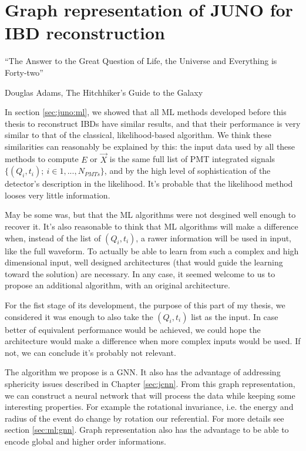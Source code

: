 \documentclass[../main.tex]{subfiles}
\begin{document}
\chapter{Graph representation of JUNO for IBD reconstruction}
\label{sec:jgnn}
\epigraph{``The Answer to the Great Question of Life, the Universe and Everything is Forty-two''}{Douglas Adams, The Hitchhiker’s Guide to the Galaxy}

\minitoc


In section \ref{sec:juno:ml}, we showed that all ML methods developed before this thesis to reconstruct IBDs have similar results, and that their performance is very similar to that of the classical, likelihood-based algorithm.
We think these similarities can reasonably be explained by this: the input data used by all these methods to compute $E$ or $\vec{X}$  is the same full list of PMT integrated signals $ \{ (Q_i,t_i) ; ~ i \in  1, ..., N_{PMTs} \}$, and by the high level of sophistication of the detector's description in the likelihood. It's probable that the likelihood method looses very little information.

May be some was, but that the ML algorithms were not desgined well enough to recover it. It's also reasonable to think that ML algorithms will make a difference when, instead of the list of $(Q_i, t_i)$, a rawer information will be used in input, like the full waveform.
To actually be able to learn from such a complex and high dimensional input, well designed architectures (that would guide the learning toward the solution) are necessary. In any case, it seemed welcome to us to propose an additional algorithm, with an original architecture.

For the fist stage of its development, the purpose of this part of my thesis, we considered it was enough to also take the $(Q_i, t_i)$ list as the input.
In case better of equivalent performance would be achieved, we could hope the architecture would make a difference when more complex inputs would be used. If not, we can conclude it's probably not relevant.

The algorithm we propose is a GNN. It also has the advantage of addressing sphericity issues described in Chapter \ref{sec:jcnn}.
From this graph representation, we can construct a neural network that will process the data while keeping some interesting properties. For example the rotational invariance, i.e. the energy and
radius of the event do change by rotation our referential. For more details see section \ref{sec:ml:gnn}. Graph representation also has the advantage to be able to encode global and higher order informations.
\end{document}
